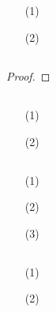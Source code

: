 \documentclass[UTF8]{ctexart}
\begin{document}
\subsection{}   %
\begin{enumerate}
    \item [(1)]
    \item [(2)]
\end{enumerate}

\subsection{}   %
\begin{proof}
    
\end{proof}

\subsection{}   %
\begin{enumerate}
    \item [(1)]
    \item [(2)]
\end{enumerate}

\subsection{}   %
\begin{enumerate}
    \item [(1)]
    \item [(2)]
    \item [(3)]
\end{enumerate}

\subsection{}   %
\begin{enumerate}
    \item [(1)]
    \item [(2)]
\end{enumerate}
\end{document}
